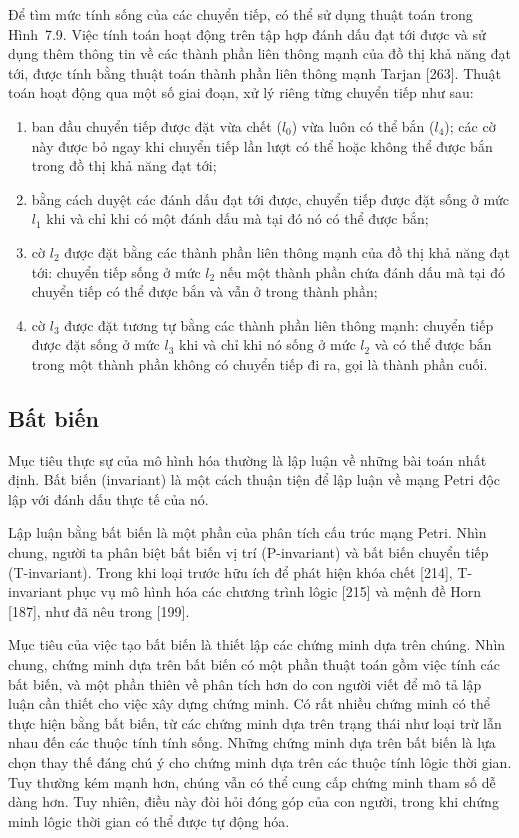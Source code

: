 Để tìm mức tính sống của các chuyển tiếp, có thể sử dụng thuật toán trong Hình~7.9. Việc tính toán hoạt động trên tập hợp đánh dấu đạt tới được và sử dụng thêm thông tin về các thành phần liên thông mạnh của đồ thị khả năng đạt tới, được tính bằng thuật toán thành phần liên thông mạnh Tarjan [263]. Thuật toán hoạt động qua một số giai đoạn, xử lý riêng từng chuyển tiếp như sau:
\begin{enumerate}
\item ban đầu chuyển tiếp được đặt vừa chết ($l_0$) vừa luôn có thể bắn ($l_4$); các cờ này được bỏ ngay khi chuyển tiếp lần lượt có thể hoặc không thể được bắn trong đồ thị khả năng đạt tới;
\item bằng cách duyệt các đánh dấu đạt tới được, chuyển tiếp được đặt sống ở mức $l_1$ khi và chỉ khi có một đánh dấu mà tại đó nó có thể được bắn;
\item cờ $l_2$ được đặt bằng các thành phần liên thông mạnh của đồ thị khả năng đạt tới: chuyển tiếp sống ở mức $l_2$ nếu một thành phần chứa đánh dấu mà tại đó chuyển tiếp có thể được bắn và vẫn ở trong thành phần;
\item cờ $l_3$ được đặt tương tự bằng các thành phần liên thông mạnh: chuyển tiếp được đặt sống ở mức $l_3$ khi và chỉ khi nó sống ở mức $l_2$ và có thể được bắn trong một thành phần không có chuyển tiếp đi ra, gọi là thành phần cuối.
\end{enumerate}

\subsection{Bất biến}
Mục tiêu thực sự của mô hình hóa thường là lập luận về những bài toán nhất định. Bất biến (invariant) là một cách thuận tiện để lập luận về mạng Petri độc lập với đánh dấu thực tế của nó.

Lập luận bằng bất biến là một phần của phân tích cấu trúc mạng Petri. Nhìn chung, người ta phân biệt bất biến vị trí (P-invariant) và bất biến chuyển tiếp (T-invariant). Trong khi loại trước hữu ích để phát hiện khóa chết [214], T-invariant phục vụ mô hình hóa các chương trình lôgic [215] và mệnh đề Horn [187], như đã nêu trong [199].

Mục tiêu của việc tạo bất biến là thiết lập các chứng minh dựa trên chúng. Nhìn chung, chứng minh dựa trên bất biến có một phần thuật toán gồm việc tính các bất biến, và một phần thiên về phân tích hơn do con người viết để mô tả lập luận cần thiết cho việc xây dựng chứng minh. Có rất nhiều chứng minh có thể thực hiện bằng bất biến, từ các chứng minh dựa trên trạng thái như loại trừ lẫn nhau đến các thuộc tính tính sống. Những chứng minh dựa trên bất biến là lựa chọn thay thế đáng chú ý cho chứng minh dựa trên các thuộc tính lôgic thời gian. Tuy thường kém mạnh hơn, chúng vẫn có thể cung cấp chứng minh tham số dễ dàng hơn. Tuy nhiên, điều này đòi hỏi đóng góp của con người, trong khi chứng minh lôgic thời gian có thể được tự động hóa.

